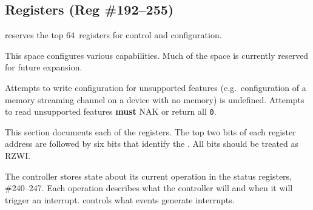 \subsection{\proto Registers (Reg \#192--255)}
\label{cmd:mmap}
\begin{minipage}{\linewidth}
  \begin{varwidth}[b]{.55\linewidth}

\proto reserves the top 64~registers for control and configuration.

\medskip
This space configures various \proto capabilities. Much of the space is
currently reserved for future expansion.

\medskip
Attempts to write configuration for unsupported features (e.g.\ configuration
of a memory streaming channel on a device with no memory) is undefined.
Attempts to read unsupported features {\bf must} NAK or return all {\tt 0}.

\medskip
This section documents each of the registers. The top two bits of each \proto
register address are  followed by six bits that
identify the . All  bits
should be treated as RZWI.

\medskip
The \proto controller stores state about its current operation in the status
registers, \#240--247. Each \proto operation describes what the \proto
controller will \mpqrecord and when it will trigger an interrupt.
 controls what events generate interrupts.


\end{varwidth}
\end{minipage}
